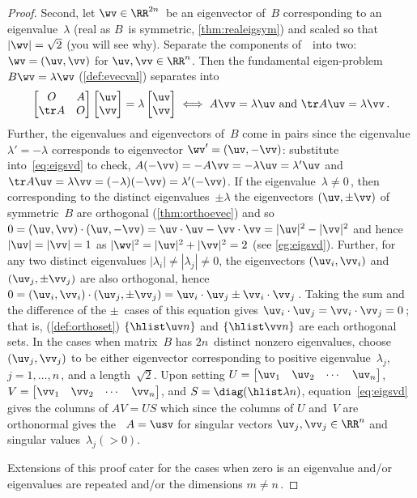\begin{proof}
Second, let \(\wv\in\RR^{2n}\)\ be an eigenvector of~\(B\) corresponding to an eigenvalue~\(\lambda\) (real as \(B\)~is symmetric, \cref{thm:realeigsym}) and scaled so that \(|\wv|=\sqrt2\) (you will see why).
Separate the components of~\wv\ into two: \(\wv=(\uv,\vv)\) for \(\uv,\vv\in\RR^n\).
Then the fundamental eigen-problem \(B\wv=\lambda\wv\)  (\cref{def:evecval}) separates into
\begin{equation}
\begin{bmatrix} O& A\\\tr A&O \end{bmatrix}\begin{bmatrix} \uv\\\vv \end{bmatrix}=\lambda\begin{bmatrix} \uv\\\vv \end{bmatrix}
\iff  A\vv=\lambda\uv \text{ and }\tr A\uv=\lambda\vv\,.
\label{eq:eigsvd}
\end{equation}
Further, the eigenvalues and eigenvectors of~\(B\) come in pairs since the eigenvalue \(\lambda'=-\lambda\) corresponds to eigenvector \(\wv'=(\uv,-\vv)\): substitute into~\eqref{eq:eigsvd} to check, \(A(-\vv)=-A\vv=-\lambda\uv=\lambda'\uv\) and \(\tr A\uv=\lambda\vv=(-\lambda)(-\vv)=\lambda'(-\vv)\).
If the eigenvalue~\(\lambda\neq0\)\,, then corresponding to the distinct eigenvalues~\(\pm\lambda\) the eigenvectors \((\uv,\pm\vv)\) of symmetric~\(B\) are orthogonal (\cref{thm:orthoevec}) and so \(0=(\uv,\vv)\cdot(\uv,-\vv)=\uv\cdot\uv-\vv\cdot\vv=|\uv|^2-|\vv|^2\) and hence \(|\uv|=|\vv|=1\) as \(|\wv|^2=|\uv|^2+|\vv|^2=2\) (see \cref{eg:eigsvd}).
Further, for any two distinct eigenvalues \(|\lambda_i|\neq|\lambda_j|\neq 0\), the eigenvectors \((\uv_i,\vv_i)\) and \((\uv_j,\pm\vv_j)\) are also orthogonal, hence \(0 =(\uv_i,\vv_i)\cdot(\uv_j,\pm\vv_j) =\uv_i\cdot\uv_j \pm\vv_i\cdot\vv_j\)\,.
Taking the sum and the difference of the \(\pm\)~cases of this equation gives \(\uv_i\cdot\uv_j=\vv_i\cdot\vv_j=0\)\,; that is,  (\cref{def:orthoset}) \(\{\hlist\uv n\}\) and \(\{\hlist\vv n\}\) are each orthogonal sets.
In the cases when matrix~\(B\) has \(2n\)~distinct nonzero eigenvalues, choose \((\uv_j,\vv_j)\) to be either eigenvector corresponding to positive eigenvalue~\(\lambda_j\), \(j=1,\ldots,n\)\,, and a length~\(\sqrt2\). 
Upon setting \(U=\begin{bmatrix} \uv_1&\uv_2&\cdots&\uv_n \end{bmatrix}\), \(V=\begin{bmatrix} \vv_1&\vv_2&\cdots&\vv_n \end{bmatrix}\), and \(S=\diag(\hlist\lambda n)\), equation~\eqref{eq:eigsvd} gives the columns of \(AV=US\) which since the columns of \(U\) and~\(V\) are orthonormal gives the \svd\ \(A=\usv\) for singular vectors \(\uv_j,\vv_j\in\RR^n\) and singular values~\(\lambda_j(>0)\).

Extensions of this proof cater for the cases when zero is an eigenvalue and/or eigenvalues are repeated and/or the dimensions \(m\neq n\)\,.
\end{proof}


